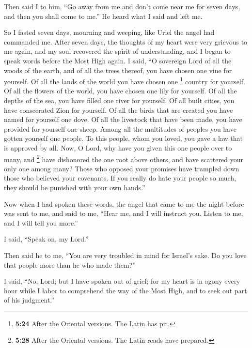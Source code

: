  Then said I to him, ``Go away from me and don't come
near me for seven days, and then you shall come to me.'' He heard what I
said and left me.

 So I fasted seven days, mourning and weeping, like Uriel
the angel had commanded me.  After seven days, the
thoughts of my heart were very grievous to me again,  and
my soul recovered the spirit of understanding, and I began to speak
words before the Most High again.  I said, ``O sovereign
Lord of all the woods of the earth, and of all the trees thereof, you
have chosen one vine for yourself.  Of all the lands of
the world you have chosen one \footnote{\textbf{5:24} After the Oriental
  versions. The Latin has pit.} country for yourself. Of all the flowers
of the world, you have chosen one lily for yourself.  Of
all the depths of the sea, you have filled one river for yourself. Of
all built cities, you have consecrated Zion for yourself.
 Of all the birds that are created you have named for
yourself one dove. Of all the livestock that have been made, you have
provided for yourself one sheep.  Among all the
multitudes of peoples you have gotten yourself one people. To this
people, whom you loved, you gave a law that is approved by all.
 Now, O Lord, why have you given this one people over to
many, and \footnote{\textbf{5:28} After the Oriental versions. The Latin
  reads have prepared.} have dishonored the one root above others, and
have scattered your only one among many?  Those who
opposed your promises have trampled down those who believed your
covenants.  If you really do hate your people so much,
they should be punished with your own hands.''

 Now when I had spoken these words, the angel that came
to me the night before was sent to me,  and said to me,
``Hear me, and I will instruct you. Listen to me, and I will tell you
more.''

 I said, ``Speak on, my Lord.''

Then said he to me, ``You are very troubled in mind for Israel's sake.
Do you love that people more than he who made them?''

 I said, ``No, Lord; but I have spoken out of grief; for
my heart is in agony every hour while I labor to comprehend the way of
the Most High, and to seek out part of his judgment.''

